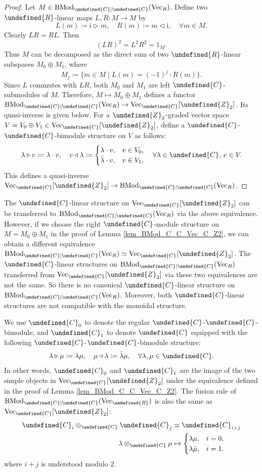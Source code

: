 \documentclass[10pt]{article}
\let\mathbb\undefined
\theoremstyle{definition}
\numberwithin{equation}{section}
\numberwithin{thm}{section}
\newcommand{\pf}{\begin{proof}}
\newcommand{\epf}{\end{proof}}
\newcommand{\Cb}{\mathbb{C}}
\newcommand{\Rb}{\mathbb{R}}
\newcommand{\Zb}{\mathbb{Z}}
\DeclareMathOperator{\BMod}{BMod}
\newcommand{\vect}{\mathrm{Vec}}
\begin{document}
\pf
Let $M \in \BMod_{\Cb|\Cb}(\vect_R)$. Define two $\Rb$-linear maps $L,R \colon M \to M$ by
\[
L(m) \coloneqq \mathrm i \triangleright m , \quad R(m) \coloneqq m \triangleleft \mathrm i , \quad \forall m \in M .
\]
Clearly $LR = RL$. Then
\[
(LR)^2 = L^2 R^2 = 1_M .
\]
Thus $M$ can be decomposed as the direct sum of two $\Rb$-linear subspaces $M_0 \oplus M_1$, where
\[
M_j \coloneqq \{m \in M \mid L(m) = (-1)^j \cdot R(m)\} .
\]
Since $L$ commutes with $LR$, both $M_0$ and $M_1$ are left $\Cb$-submodules of $M$. Therefore, $M \mapsto M_0 \oplus M_1$ defines a functor $\BMod_{\Cb|\Cb}(\vect_R) \to \vect_\Cb[\Zb_2]$. Its quasi-inverse is given below. For a $\Zb_2$-graded vector space $V = V_0 \oplus V_1 \in \vect_\Cb[\Zb_2]$, define a $\Cb$-$\Cb$-bimodule structure on $V$ as follows:
\[
\lambda \triangleright v \coloneqq \lambda \cdot v , \quad v \triangleleft \lambda \coloneqq \begin{cases}
\lambda \cdot v , & v \in V_0 , \\
\bar{\lambda} \cdot v , & v \in V_1 ,
\end{cases} \quad \forall \lambda \in \Cb , \, v \in V .
\]
This defines a quasi-inverse $\vect_\Cb[\Zb_2] \to \BMod_{\Cb|\Cb}(\vect_R)$. 
\epf

The $\Cb$-linear structure on $\vect_\Cb[\Zb_2]$ can be transferred to $\BMod_{\Cb|\Cb}(\vect_R)$ via the above equivalence. However, if we choose the right $\Cb$-module structure on $M = M_0 \oplus M_1$ in the proof of Lemma \ref{lem_BMod_C_C_Vec_C_Z2}, we can obtain a different equivalence $\BMod_{\Cb|\Cb}(\vect_R) \simeq \vect_\Cb[\Zb_2]$. The $\Cb$-linear structures on $\BMod_{\Cb|\Cb}(\vect_R)$ transferred from $\vect_\Cb[\Zb_2]$ via these two equivalences are not the same. So there is no canonical $\Cb$-linear structure on $\BMod_{\Cb|\Cb}(\vect_R)$. Moreover, both $\Cb$-linear structures are not compatible with the monoidal structure.

We use $\Cb_0$ to denote the regular $\Cb$-$\Cb$-bimodule, and $\Cb_1$ to denote $\Cb$ equipped with the following $\Cb$-$\Cb$-bimodule structure:
\[
\lambda \triangleright \mu \coloneqq \lambda \mu , \quad \mu \triangleleft \lambda \coloneqq \bar \lambda \mu , \quad \forall \lambda,\mu \in \Cb .
\]
In other words, $\Cb_0$ and $\Cb_1$ are the image of the two simple objects in $\vect_\Cb[\Zb_2]$ under the equivalence defined in the proof of Lemma \ref{lem_BMod_C_C_Vec_C_Z2}. The fusion rule of $\BMod_{\Cb|\Cb}(\vect_\Rb)$ is also the same as $\vect_\Cb[\Zb_2]$:
\begin{align} \label{eq_fusion_rule_BMod_C_C}
\Cb_i \otimes_\Cb \Cb_j & \simeq \Cb_{i+j} \\
\lambda \otimes_\Cb \mu & \mapsto \begin{cases}
\lambda \mu , & i = 0 , \\
\lambda \bar \mu , & i = 1 .
\end{cases} \nonumber
\end{align}
where $i+j$ is understood modulo $2$.
\end{document}
